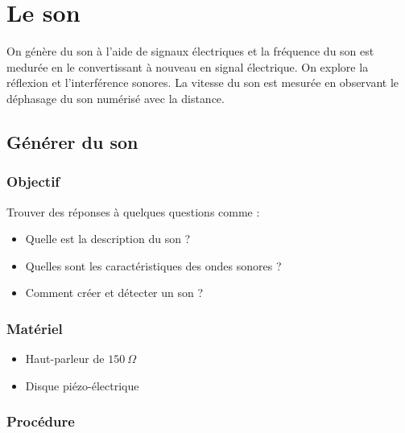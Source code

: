 \documentclass{book}
\begin{document}

\chapter{Le son}


On génère du son à l'aide de signaux électriques et la fréquence du son est medurée en le convertissant à nouveau en signal électrique. On explore la réflexion et l'interférence sonores. La vitesse du son est mesurée en observant le déphasage du son numérisé avec la distance.







\section{Générer du son}



\subsection{Objectif}


Trouver des réponses à quelques questions comme :
\begin{itemize}
  \item Quelle est la description du son ?
  \item Quelles sont les caractéristiques des ondes sonores ?
  \item Comment créer et détecter un son ?
\end{itemize}




\subsection{Matériel}


\begin{itemize}
  \item Haut-parleur de $150\ \Omega$
  \item Disque piézo-électrique
\end{itemize}

\subsection{Procédure}
\end{document}
